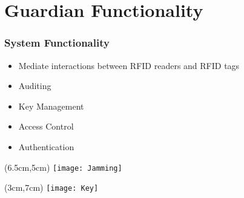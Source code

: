 \section{Guardian Functionality}

\begin{frame}
 \frametitle{System Functionality}

 \begin{itemize}
  \item<1-> Mediate interactions between RFID readers and RFID tags
  \item<2-> Auditing
  \item<3-> Key Management
  \item<4-> Access Control
  \item<5-> Authentication
 \end{itemize}

 \begin{textblock*}{5cm}(6.5cm,5cm)
  \texttt{[image: Jamming]}
 \end{textblock*}



 \begin{textblock*}{5cm}(3cm,7cm)
  \texttt{[image: Key]}
 \end{textblock*}


\end{frame}
